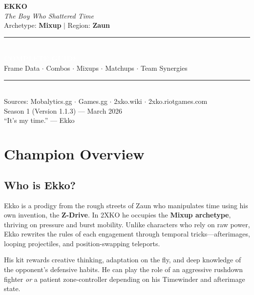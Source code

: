 \documentclass[12pt, a4paper]{report}
\begin{document}
\begin{titlepage}
  \centering
  \vspace*{2cm}
  {\fontsize{48}{56}\selectfont\bfseries\textcolor{ekkoBlue}{EKKO}}\\[0.5em]
  {\Large\textcolor{ekkoPurple}{\textit{The Boy Who Shattered Time}}}\\[0.3em]
  {\small\textcolor{ekkoGray}{Archetype: \textbf{Mixup} $\mid$ Region: \textbf{Zaun}}}\\[3em]
  \textcolor{ekkoPurple}{\rule{0.8\linewidth}{2pt}}\\[2em]
  {\Huge\bfseries\textcolor{white}{COMPLETE GUIDE}}\\[1em]
  {\large\textcolor{ekkoGray}{Frame Data $\cdot$ Combos $\cdot$ Mixups $\cdot$ Matchups $\cdot$ Team Synergies}}\\[3em]
  \textcolor{ekkoPurple}{\rule{0.8\linewidth}{2pt}}\\[2em]
  {\normalsize\textcolor{ekkoGray}{
    Sources: Mobalytics.gg $\cdot$ Games.gg $\cdot$ 2xko.wiki $\cdot$ 2xko.riotgames.com\\
    Season 1 (Version 1.1.3) --- March 2026
  }}\\[3em]
  \vfill
  {\small\textcolor{ekkoPurple}{``It's my time.'' --- Ekko}}
\end{titlepage}

\tableofcontents
\newpage

\chapter{Champion Overview}

\section{Who is Ekko?}

Ekko is a prodigy from the rough streets of Zaun who manipulates time using his own invention, the \textbf{Z-Drive}. In 2XKO he occupies the \textbf{Mixup archetype}, thriving on pressure and burst mobility. Unlike characters who rely on raw power, Ekko rewrites the rules of each engagement through temporal tricks---afterimages, looping projectiles, and position-swapping teleports.

His kit rewards creative thinking, adaptation on the fly, and deep knowledge of the opponent's defensive habits. He can play the role of an aggressive rushdown fighter \textit{or} a patient zone-controller depending on his Timewinder and afterimage state.
\end{document}
